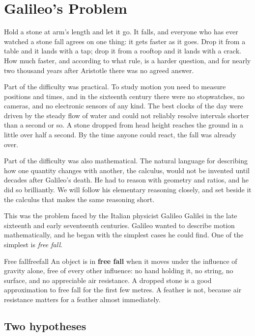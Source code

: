 \documentclass[11pt,twoside,openany]{book}
\begin{document}
\section{Galileo's Problem}

Hold a stone at arm's length and let it go. It falls, and everyone who has ever watched a stone fall agrees on one thing: it gets faster as it goes. Drop it from a table and it lands with a tap; drop it from a rooftop and it lands with a crack. How much faster, and according to what rule, is a harder question, and for nearly two thousand years after Aristotle there was no agreed answer.

Part of the difficulty was practical. To study motion you need to measure positions and times, and in the sixteenth century there were no stopwatches, no cameras, and no electronic sensors of any kind. The best clocks of the day were driven by the steady flow of water and could not reliably resolve intervals shorter than a second or so. A stone dropped from head height reaches the ground in a little over half a second. By the time anyone could react, the fall was already over.

Part of the difficulty was also mathematical. The natural language for describing how one quantity changes with another, the calculus, would not be invented until decades after Galileo's death. He had to reason with geometry and ratios, and he did so brilliantly. We will follow his elementary reasoning closely, and set beside it the calculus that makes the same reasoning short.

This was the problem faced by the Italian physicist Galileo Galilei in the late sixteenth and early seventeenth centuries. Galileo wanted to describe motion mathematically, and he began with the simplest cases he could find. One of the simplest is \emph{free fall}.

\begin{definition}{Free fall}{freefall}
An object is in \textbf{free fall} when it moves under the influence of gravity alone, free of every other influence: no hand holding it, no string, no surface, and no appreciable air resistance. A dropped stone is a good approximation to free fall for the first few metres. A feather is not, because air resistance matters for a feather almost immediately.
\end{definition}

\subsection{Two hypotheses}
\end{document}
